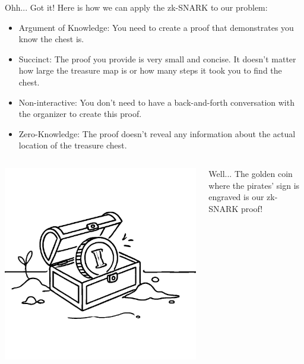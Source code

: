 \documentclass{beamer}
\begin{document}
    \begin{frame}{Ohh... Got it!}
        Here is how we can apply the zk-SNARK to our problem:

        \begin{itemize}
            \item Argument of Knowledge: You need to create a proof that demonstrates you know the
            chest is. \pause
            \item Succinct: The proof you provide is very small and concise. It doesn't matter how
            large the treasure map is or how many steps it took you to find the chest. \pause
            \item Non-interactive: You don't need to have a back-and-forth conversation with the 
            organizer to create this proof. \pause
            \item Zero-Knowledge: The proof doesn't reveal any information about the actual 
            location of the treasure chest.
        \end{itemize}

        \pause

        \begin{columns}
            \begin{column}{0.3\textwidth}
                \includegraphics[width=\textwidth]{../presentations/images/lecture_8/treasure.jpg}
            \end{column}

            \begin{column}{0.65\textwidth}
                Well... The golden coin where the pirates' sign is engraved is our zk-SNARK proof!
            \end{column}
        \end{columns}
    \end{frame}
\end{document}
